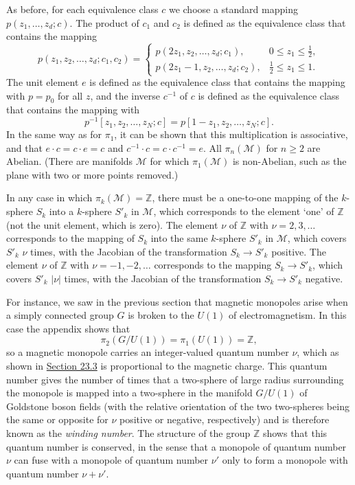 As before, for each equivalence class $c$ we choose a standard mapping
$p(z_1,\ldots,z_d;c)$. The product of $c_1$ and $c_2$ is defined as the
equivalence class that contains the mapping
\begin{equation}
 p(z_1,z_2,\ldots,z_d;c_1,c_2)=
 \begin{cases}
  p(2z_1,z_2,\ldots,z_d;c_1),&0\leq z_1\leq\tfrac12,\\
  p(2z_1-1,z_2,\ldots,z_d;c_2),&\tfrac12\leq z_1\leq1.
 \end{cases}
 \tag{23.2.6}\label{eq:23.2.6}
\end{equation}
The unit element $e$ is defined as the equivalence class that contains the
mapping with $p=p_0$ for all $z$, and the inverse $c^{-1}$ of $c$ is
defined as the equivalence class that contains the mapping with
\begin{equation}
 p^{-1}[z_1,z_2,\ldots,z_N;c]
 =p[1-z_1,z_2,\ldots,z_N;c].
 \tag{23.2.7}\label{eq:23.2.7}
\end{equation}
In the same way as for $\pi_1$, it can be shown that this multiplication is
associative, and that $e\cdot c=c\cdot e=c$ and
$c^{-1}\cdot c=c\cdot c^{-1}=e$. All $\pi_n(\mathcal M)$ for $n\geq2$
are Abelian. (There are manifolds $\mathcal M$ for which
$\pi_1(\mathcal M)$ is non-Abelian, such as the plane with two or more
points removed.)

In any case in which $\pi_k(\mathcal M)=\mathbb Z$, there must be a
one-to-one mapping of the $k$-sphere $S_k$ into a $k$-sphere $S'_k$ in
$\mathcal M$, which corresponds to the element `one' of $\mathbb Z$ (not
the unit element, which is zero). The element $\nu$ of $\mathbb Z$ with
$\nu=2,3,\ldots$ corresponds to the mapping of $S_k$ into the same
$k$-sphere $S'_k$ in $\mathcal M$, which covers $S'_k$ $\nu$ times, with
the Jacobian of the transformation $S_k\to S'_k$ positive. The element
$\nu$ of $\mathbb Z$ with $\nu=-1,-2,\ldots$ corresponds to the mapping
$S_k\to S'_k$, which covers $S'_k$ $|\nu|$ times, with the Jacobian of
the transformation $S_k\to S'_k$ negative.

For instance, we saw in the previous section that magnetic monopoles arise
when a simply connected group $G$ is broken to the $U(1)$ of
electromagnetism. In this case the appendix shows that
\begin{equation}
 \pi_2(G/U(1))=\pi_1(U(1))=\mathbb Z,
 \tag{23.2.8}\label{eq:23.2.8}
\end{equation}
so a magnetic monopole carries an integer-valued quantum number $\nu$,
which as shown in \hyperref[sec:23.3]{Section 23.3} is proportional to the
magnetic charge. This quantum number gives the number of times that a
two-sphere of large radius surrounding the monopole is mapped into a
two-sphere in the manifold $G/U(1)$ of Goldstone boson fields (with the
relative orientation of the two two-spheres being the same or opposite
for $\nu$ positive or negative, respectively) and is therefore known as
the \emph{winding number}. The structure of the group $\mathbb Z$ shows
that this quantum number is conserved, in the sense that a monopole of
quantum number $\nu$ can fuse with a monopole of quantum number $\nu'$
only to form a monopole with quantum number $\nu+\nu'$.

